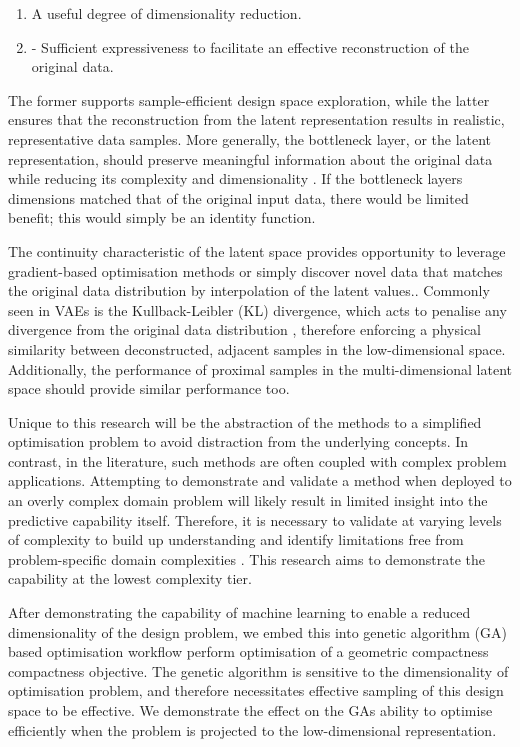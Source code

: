 \documentclass{article}
\begin{document}
\begin{enumerate}
    \item A useful degree of dimensionality reduction.
    \item - Sufficient expressiveness to facilitate an effective reconstruction of the original data.
\end{enumerate}

The former supports sample-efficient design space exploration, while the latter ensures that the reconstruction from the latent representation results in realistic, representative data samples. More generally, the bottleneck layer, or the latent representation, should preserve meaningful information about the original data while reducing its complexity and dimensionality \citep{Zheng2023}. If the bottleneck layers dimensions matched that of the original input data, there would be limited benefit; this would simply be an identity function. 

The continuity characteristic of the latent space provides opportunity to leverage gradient-based optimisation methods or simply discover novel data that matches the original data distribution by interpolation of the latent values.. Commonly seen in VAEs is the Kullback-Leibler (KL) divergence, which acts to penalise any divergence from the original data distribution \citep{Zheng2023}, therefore enforcing a physical similarity between deconstructed, adjacent samples in the low-dimensional space. Additionally, the performance of proximal samples in the multi-dimensional latent space should provide similar performance too.

Unique to this research will be the abstraction of the methods to a simplified optimisation problem to avoid distraction from the underlying concepts. In contrast, in the literature, such methods are often coupled with complex problem applications. Attempting to demonstrate and validate a method when deployed to an overly complex domain problem will likely result in limited insight into the predictive capability itself. Therefore, it is necessary to validate at varying levels of complexity to build up understanding and identify limitations free from problem-specific domain complexities \citep{Hobbs2021}. This research aims to demonstrate the capability at the lowest complexity tier.

After demonstrating the capability of machine learning to enable a reduced dimensionality of the design problem, we embed this into genetic algorithm (GA) based optimisation workflow perform optimisation of a geometric compactness compactness objective. The genetic algorithm is sensitive to the dimensionality of optimisation problem, and therefore necessitates effective sampling of this design space to be effective. We demonstrate the effect on the GAs ability to optimise efficiently when the problem is projected to the low-dimensional representation.
\end{document}
